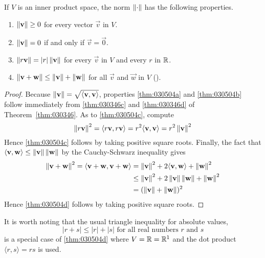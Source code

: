 \documentclass{ximera}
\begin{document}
\begin{theorem}\label{thm:030504}
If $V$ is an inner product space, the norm $\left\lVert \cdot \right\rVert$ has the following properties.

\begin{enumerate}
\item\label{thm:030504a} $\left\lVert\mathbf{v}\right\rVert \geq 0$ for every vector $\vec{v}$ in $V$.

\item\label{thm:030504b} $\left\lVert\mathbf{v}\right\rVert = 0$ if and only if $\vec{v} = \vec{0}$.

\item\label{thm:030504c} $\left\lVert r \mathbf{v}\right\rVert = |r|\left\lVert\mathbf{v}\right\rVert$ for every $\vec{v}$ in $V$ and every $r$ in $\mathbb{R}$.

\item\label{thm:030504d} $\left\lVert\mathbf{v} + \mathbf{w}\right\rVert \leq \left\lVert\mathbf{v}\right\rVert + \left\lVert\mathbf{w}\right\rVert$ for all $\vec{v}$ and $\vec{w}$ in $V$ ().

\end{enumerate}
\end{theorem}

\begin{proof}
Because $\left\lVert \mathbf{v} \right\rVert = \sqrt{\langle \mathbf{v}, \mathbf{v} \rangle}$, properties \ref{thm:030504a} and \ref{thm:030504b} follow immediately from \ref{thm:030346c} and \ref{thm:030346d} of Theorem~\ref{thm:030346}. As to \ref{thm:030504c}, compute
\begin{equation*}
\left\lVert r\mathbf{v} \right\rVert ^2 = \langle r\mathbf{v}, r\mathbf{v} \rangle = r^2\langle \mathbf{v}, \mathbf{v} \rangle = r^2\left\lVert \mathbf{v} \right\rVert^2
\end{equation*}
Hence \ref{thm:030504c} follows by taking positive square roots. Finally, the fact that $\langle\mathbf{v}, \mathbf{w}\rangle \leq \left\lVert\mathbf{v}\right\rVert\left\lVert\mathbf{w}\right\rVert$ by the Cauchy-Schwarz inequality gives
\begin{align*}
\left\lVert \mathbf{v} + \mathbf{w} \right\rVert ^2 =
\langle \mathbf{v} + \mathbf{w}, \mathbf{v} + \mathbf{w} \rangle &=
\left\lVert \mathbf{v} \right\rVert ^2 + 2 \langle \mathbf{v}, \mathbf{w} \rangle +
\left\lVert \mathbf{w} \right\rVert ^2 \\
&\leq \left\lVert \mathbf{v} \right\rVert ^2 +
2 \left\lVert \mathbf{v} \right\rVert \left\lVert \mathbf{w} \right\rVert +
\left\lVert \mathbf{w} \right\rVert ^2 \\
&= (\left\lVert \mathbf{v} \right\rVert + \left\lVert \mathbf{w} \right\rVert)^2
\end{align*}
Hence \ref{thm:030504d} follows by taking positive square roots.
\end{proof}

It is worth noting that the usual triangle inequality for absolute values,
\begin{equation*}
| r + s | \leq |r| + |s| \mbox{ for all real numbers } r \mbox{ and } s
\end{equation*}
is a special case of \ref{thm:030504d} where $V = \mathbb{R} = \mathbb{R}^1$ and the dot product $\langle r, s \rangle = rs$ is used.
\end{document}
